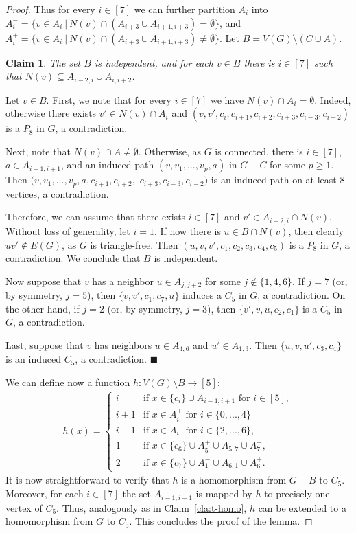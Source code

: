 \documentclass[11pt,a4paper]{article}
\theoremstyle{mystyle}
\newtheorem{claim}{Claim}[theorem]
\newenvironment{claimproof}{\noindent {\emph{Proof of Claim.}}}{\hfill$\blacksquare$\medskip}
\begin{document}
\begin{proof}
Thus for every $i\in [7]$ we can further partition $A_i$ into $A^-_i=\{v \in A_i~|~N(v) \cap (A_{i+3}\cup A_{i+1,i+3})=\emptyset\}$, and $A^+_i=\{v \in A_i~|~N(v) \cap (A_{i+3}\cup A_{i+1,i+3})\neq\emptyset\}$.
Let $B = V(G) \setminus (C \cup A)$.

\begin{claim}
The set $B$ is independent, and for each $v \in B$ there is $i \in [7]$ such that $N(v) \subseteq A_{i-2,i} \cup A_{i,i+2}$.
\end{claim}
\begin{claimproof}
Let $v \in B$.
First, we note that for every $i \in [7]$ we have $N(v) \cap A_i = \emptyset$. Indeed, otherwise there exists $v' \in N(v) \cap A_i$ and $(v,v',c_i,c_{i+1},c_{i+2},c_{i+3},c_{i-3},c_{i-2})$ is a $P_8$ in $G$, a contradiction.

Next, note that $N(v) \cap A \neq \emptyset$. Otherwise, as $G$ is connected, there is $i \in [7]$, $a \in A_{i-1,i+1}$, and an induced path $(v,v_1,\ldots,v_p,a)$ in $G-C$ for some $p \geq 1$. Then $(v,v_1,\ldots,v_p,a,c_{i+1},c_{i+2},$ $c_{i+3},c_{i-3},c_{i-2})$ is an induced path on at least 8 vertices, a contradiction.

Therefore, we can assume that there exists $i \in [7]$ and $v' \in A_{i-2,i} \cap N(v)$. Without loss of generality, let $i=1$.
If now there is $u \in B \cap N(v)$, then clearly $uv' \notin E(G)$, as $G$ is triangle-free. Then $(u,v,v',c_1,c_2,c_3,c_4,c_5)$ is a $P_8$ in $G$, a contradiction. We conclude that $B$ is independent.

Now suppose that $v$ has a neighbor $u \in A_{j,j+2}$ for some $j \notin \{1,4,6\}$. If $j=7$ (or, by symmetry, $j=5$), then $\{v,v',c_1,c_7,u\}$ induces a $C_5$ in $G$, a contradiction. On the other hand, if $j=2$ (or, by symmetry, $j=3$), then $\{v',v,u,c_2,c_1\}$ is a $C_5$ in $G$, a contradiction.

Last, suppose that $v$ has neighbors $u \in A_{4,6}$ and $u' \in A_{1,3}$.
Then $\{u,v,u',c_3,c_4\}$ is an induced $C_5$, a contradiction.
\end{claimproof}

We can define now a function $h: V(G)\setminus B \to [5]$:
\begin{align*}
h(x)=\begin{cases}
i & \textrm{if }x\in\{c_i\}\cup A_{i-1,i+1}\textrm{ for }i \in [5], \\
i+1& \textrm{if }x\in A^+_{i}\textrm{ for }i \in \{0,...,4\} \\
i-1 & \textrm{if }x\in A^-_{i}\textrm{ for }i \in \{2,...,6\}, \\
1& \textrm{if }x\in\{c_6\} \cup A^+_5 \cup A_{5,7}\cup A^-_7, \\
2& \textrm{if }x\in\{c_7\} \cup A^-_1 \cup A_{6,1}\cup A^+_6.
\end{cases}
\end{align*}
It is now straightforward to verify that $h$ is a homomorphism from $G - B$ to $C_5$. Moreover, for each $i \in [7]$ the set $A_{i-1,i+1}$ is mapped by $h$ to precisely one vertex of $C_5$. Thus, analogously as in Claim~\ref{cla:t-homo}, $h$ can be extended to a homomorphism from $G$ to $C_5$. This concludes the proof of the lemma.
\end{proof}
\end{document}
